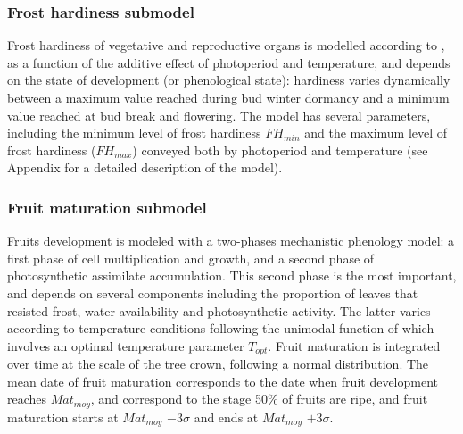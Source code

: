 \documentclass[letterpaper,8pt]{extarticle}  %
\begin{document}
\begin{doublespacing}
\begin{linenumbers}


\subsubsection{Frost hardiness submodel}

Frost hardiness of vegetative and reproductive organs is modelled according to \citet{Leinonen1996}, as a function of the additive effect of photoperiod and temperature, and depends on the state of development (or phenological state): hardiness varies dynamically between a maximum value reached during bud winter dormancy and a minimum value reached at bud break and flowering. The model has several parameters, including the minimum level of frost hardiness $FH_{min}$ and the maximum level of frost hardiness ($FH_{max}$) conveyed both by photoperiod and temperature (see Appendix for a detailed description of the model). 

\subsubsection{Fruit maturation submodel}

Fruits development is modeled with a two-phases mechanistic phenology model:  a first phase of cell multiplication and growth, and a second phase of photosynthetic assimilate accumulation. This second phase is the most important, and depends on several components including the proportion of leaves that resisted frost, water availability and photosynthetic activity. The latter varies according to temperature conditions following the unimodal function of \citet{Wang1998} which involves an optimal temperature parameter $T_{opt}$.  Fruit maturation is integrated over time at the scale of the tree crown, following a normal distribution. The mean date of fruit maturation corresponds to the date when fruit development reaches $Mat_{moy}$, and correspond to the stage 50\% of fruits are ripe,  and fruit maturation starts at $Mat_{moy}$ $-3\sigma$ and ends at $Mat_{moy}$ $+3\sigma$.


\end{linenumbers}
\end{doublespacing}
\end{document}
